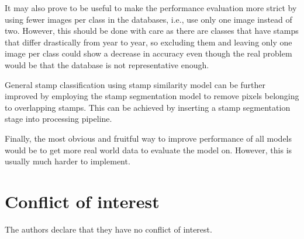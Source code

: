 \documentclass[twocolumn]{svjour3}
\begin{document}
It may also prove to be useful to make the performance evaluation more strict by using fewer images per class in the databases, i.e., use only one image instead of two. However, this should be done with care as there are classes that have stamps that differ drastically from year to year, so excluding them and leaving only one image per class could show a decrease in accuracy even though the real problem would be that the database is not representative enough.

General stamp classification using stamp similarity model can be further improved by employing the stamp segmentation model to remove pixels belonging to overlapping stamps. This can be achieved by inserting a stamp segmentation stage into processing pipeline.

Finally, the most obvious and fruitful way to improve performance of all models would be to get more real world data to evaluate the model on. However, this is usually much harder to implement.

\section*{Conflict of interest}

The authors declare that they have no conflict of interest.
\end{document}
